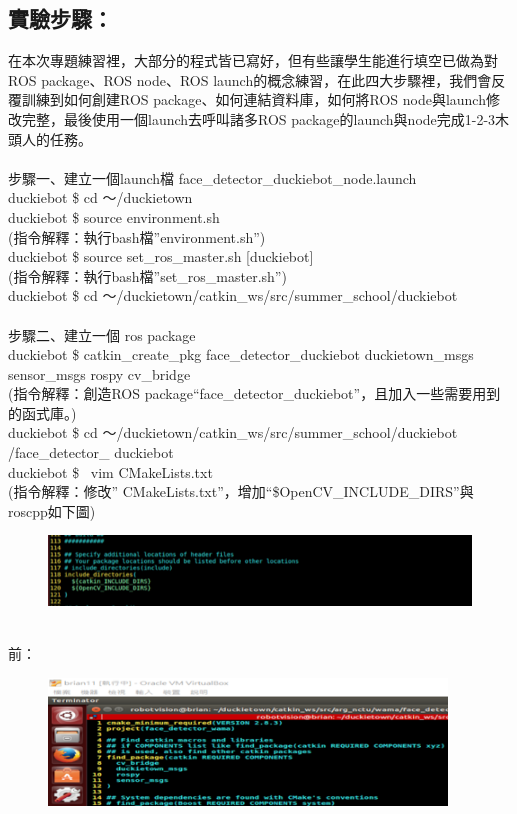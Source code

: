 \documentclass{article}
\begin{document}
\subsection{實驗步驟：}
在本次專題練習裡，大部分的程式皆已寫好，但有些讓學生能進行填空已做為對ROS package、ROS node、ROS launch的概念練習，在此四大步驟裡，我們會反覆訓練到如何創建ROS package、如何連結資料庫，如何將ROS node與launch修改完整，最後使用一個launch去呼叫諸多ROS package的launch與node完成1-2-3木頭人的任務。
\\\\步驟一、建立一個launch檔 face\_detector\_duckiebot\_node.launch
\\duckiebot \$ cd ～/duckietown
\\duckiebot \$ source environment.sh
\\(指令解釋：執行bash檔”environment.sh”)
\\duckiebot \$ source set\_ros\_master.sh [duckiebot]
\\(指令解釋：執行bash檔”set\_ros\_master.sh”)
\\duckiebot \$ cd ～/duckietown/catkin\_ws/src/summer\_school/duckiebot
\\\\步驟二、建立一個 ros package
\\duckiebot \$ catkin\_create\_pkg face\_detector\_duckiebot duckietown\_msgs sensor\_msgs rospy cv\_bridge
\\(指令解釋：創造ROS package“face\_detector\_duckiebot”，且加入一些需要用到的函式庫。)
\\duckiebot \$ cd ～/duckietown/catkin\_ws/src/summer\_school/duckiebot /face\_detector\_ duckiebot
\\duckiebot \$  vim CMakeLists.txt 
\\(指令解釋：修改” CMakeLists.txt”，增加“\${OpenCV\_INCLUDE\_DIRS}”與roscpp如下圖)
\begin{figure}[htp]
    \begin{center}
        \includegraphics[width=400pt]{pic/5_3_2.png}
    \end{center}
\end{figure}
\\
前：
\begin{figure}[htp]
    \begin{center}
        \includegraphics[width=300pt]{pic/5_3_3.png}
    \end{center}
\end{figure}
\end{document}
